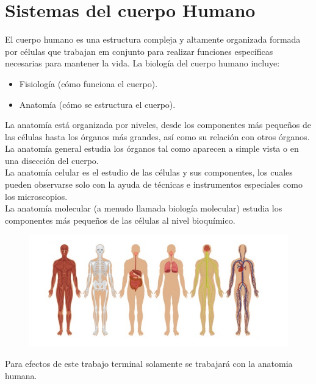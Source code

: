 \section{Sistemas del cuerpo Humano}
El cuerpo humano es una estructura compleja y altamente organizada formada por células que trabajan em conjunto para realizar funciones específicas necesarias 
para mantener la vida.\cite{web17} La biología del cuerpo humano incluye:
\begin{itemize}
	\item Fisiología (cómo funciona el cuerpo).
	\item Anatomía (cómo se estructura el cuerpo).	
\end{itemize}
La anatomía está organizada por niveles, desde los componentes más pequeños de las células hasta los órganos más grandes, así como su relación con otros órganos.\\
La anatomía general estudia los órganos tal como aparecen a simple vista o en una disección del cuerpo.\\
La anatomía celular es el estudio de las células y sus componentes, los cuales pueden observarse solo con la ayuda de técnicas e instrumentos especiales como los microscopios.\\
La anatomía molecular (a menudo llamada biología molecular) estudia los componentes más pequeños de las células al nivel bioquímico.\\
\begin{figure}[H]
\begin{center}
	\includegraphics[width = .7\textwidth]{source/images/image22.png}
	\end{center} 
\end{figure}
Para efectos de este trabajo terminal solamente se trabajará con la anatomia humana.

